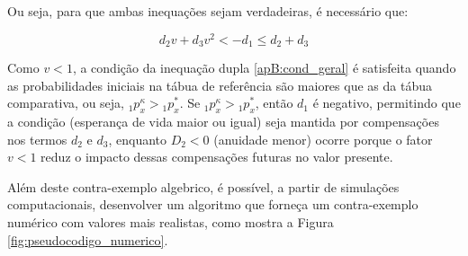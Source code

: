 Ou seja, para que ambas inequações sejam verdadeiras, é necessário que:

\begin{equation}
    d_2v + d_3v^2 < -d_1 \leq d_2 + d_3
    \label{apB:cond_geral}
\end{equation}

Como $v<1$, a condição da inequação dupla \ref{apB:cond_geral} é satisfeita quando as probabilidades iniciais na tábua de referência são maiores que as da tábua comparativa, ou seja, ${}_{1}p^{\kappa}_x > {}_{1}p^{*}_x$. Se ${}_{1}p^{\kappa}_x > {}_{1}p^{*}_x$, então $d_1$ é negativo, permitindo que a condição  (esperança de vida maior ou igual) seja mantida por compensações nos termos $d_2$ e $d_3$, enquanto $D_2<0$ (anuidade menor) ocorre porque o fator $v<1$ reduz o impacto dessas compensações futuras no valor presente.

Além deste contra-exemplo algebrico, é possível, a partir de simulações computacionais, desenvolver um algoritmo que forneça um contra-exemplo numérico com valores mais realistas, como mostra a Figura \ref{fig:pseudocodigo_numerico}.

